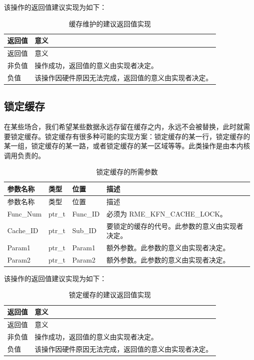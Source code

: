 该操作的返回值建议实现为如下：

\begin{xltabular}{\textwidth}{@{}>{\hsize\raggedright\arraybackslash}X>{\hsize\raggedright\arraybackslash}X@{}}
\caption{缓存维护的建议返回值实现}\label{tab:8-30-cache-maintenance-suggested-return-values}\\
\toprule
返回值 & 意义\tabularnewline
\endfirsthead
\toprule
返回值 & 意义\tabularnewline
\midrule
\endhead
\bottomrule
\endlastfoot
    非负值 & 操作成功，返回值的意义由实现者决定。\tabularnewline
    负值 & 该操作因硬件原因无法完成，返回值的意义由实现者决定。\tabularnewline
\end{xltabular}

\subsection{锁定缓存}\label{subsec:8-lock-cache}

在某些场合，我们希望某些数据永远存留在缓存之内，永远不会被替换，此时就需要锁定缓存。锁定缓存有很多种可能的实现方案：锁定缓存的某一行，锁定缓存的某一组，锁定缓存的某一路，或者锁定缓存的某一区域等等。此类操作是由本内核调用负责的。

\begin{xltabular}{\textwidth}{@{}>{\hsize\raggedright\arraybackslash}X>{\hsize\raggedright\arraybackslash}X>{\hsize\raggedright\arraybackslash}X>{\hsize\raggedright\arraybackslash}X@{}}
\caption{锁定缓存的所需参数}\label{tab:8-31-lock-cache-parameters}\\
\toprule
参数名称 & 类型 & 位置 & 描述\tabularnewline
\endfirsthead
\toprule
参数名称 & 类型 & 位置 & 描述\tabularnewline
\midrule
\endhead
\bottomrule
\endlastfoot
Func\_Num & ptr\_t & Func\_ID & 必须为 RME\_KFN\_CACHE\_LOCK。\tabularnewline
Cache\_ID & ptr\_t & Sub\_ID &
要锁定的缓存的代号。此参数的意义由实现者决定。\tabularnewline
Param1 & ptr\_t & Param1 &
额外参数。此参数的意义由实现者决定。\tabularnewline
Param2 & ptr\_t & Param2 &
额外参数。此参数的意义由实现者决定。\tabularnewline
\end{xltabular}

该操作的返回值建议实现为如下：

\begin{xltabular}{\textwidth}{@{}>{\hsize\raggedright\arraybackslash}X>{\hsize\raggedright\arraybackslash}X@{}}
\caption{锁定缓存的建议返回值实现}\label{tab:8-32-lock-cache-suggested-return-values}\\
\toprule
返回值 & 意义\tabularnewline
\endfirsthead
\toprule
返回值 & 意义\tabularnewline
\midrule
\endhead
\bottomrule
\endlastfoot
    非负值 & 操作成功，返回值的意义由实现者决定。\tabularnewline
    负值 & 该操作因硬件原因无法完成，返回值的意义由实现者决定。\tabularnewline
\end{xltabular}

